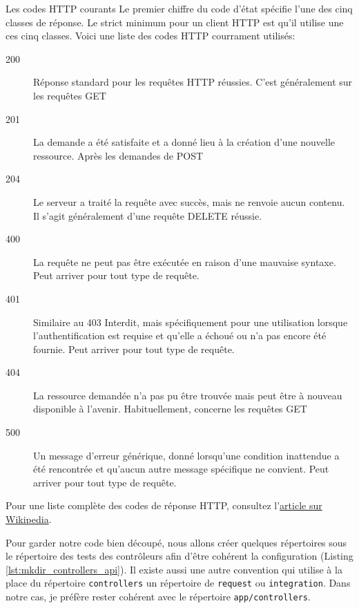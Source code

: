 \documentclass[]{report}
\begin{document}
    \begin{tcolorbox}{Les codes HTTP courants}\label{box:common_http_code}
      Le premier chiffre du code d'état spécifie l'une des cinq classes de réponse. Le strict minimum pour un client HTTP est qu'il utilise une ces cinq classes. Voici une liste des codes HTTP courrament utilisés:

      \begin{description}
        \item[200] Réponse standard pour les requêtes HTTP réussies. C'est généralement sur les requêtes GET
        \item[201] La demande a été satisfaite et a donné lieu à la création d'une nouvelle ressource. Après les demandes de POST
        \item[204] Le serveur a traité la requête avec succès, mais ne renvoie aucun contenu. Il s'agit généralement d'une requête DELETE réussie.
        \item[400] La requête ne peut pas être exécutée en raison d'une mauvaise syntaxe. Peut arriver pour tout type de requête.
        \item[401] Similaire au 403 Interdit, mais spécifiquement pour une utilisation lorsque l'authentification est requise et qu'elle a échoué ou n'a pas encore été fournie. Peut arriver pour tout type de requête.
        \item[404] La ressource demandée n'a pas pu être trouvée mais peut être à nouveau disponible à l'avenir. Habituellement, concerne les requêtes GET
        \item[500] Un message d'erreur générique, donné lorsqu'une condition inattendue a été rencontrée et qu'aucun autre message spécifique ne convient. Peut arriver pour tout type de requête.
      \end{description}

      Pour une liste complète des codes de réponse HTTP, consultez l'\href{https://fr.wikipedia.org/wiki/Liste_des_codes_HTTP}{article sur Wikipedia}.
    \end{tcolorbox}

    Pour garder notre code bien découpé, nous allons créer quelques répertoires sous le répertoire des tests des contrôleurs afin d'être cohérent la configuration (Listing \ref{lst:mkdir_controllers_api}). Il existe aussi une autre convention qui utilise à la place du répertoire \verb|controllers| un répertoire de \verb|request| ou \verb|integration|. Dans notre cas, je préfère rester cohérent avec le répertoire \verb|app/controllers|.
\end{document}
